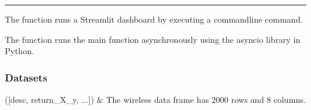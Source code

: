 \documentclass[letterpaper,10pt,english,openany,oneside]{sphinxmanual}
\begin{document}
\bigskip\hrule\bigskip


\begin{fulllineitems}
\label{\detokenize{api_reference/generated/QuadratiK.ui.UI:QuadratiK.ui.UI.main}}
\pysigstartsignatures
{}
\pysigstopsignatures
\sphinxAtStartPar
The  function runs a Streamlit dashboard by executing a command\sphinxhyphen{}line command.

\end{fulllineitems}


\begin{fulllineitems}
\label{\detokenize{api_reference/generated/QuadratiK.ui.UI:QuadratiK.ui.UI.run}}
\pysigstartsignatures
{}
\pysigstopsignatures
\sphinxAtStartPar
The function runs the main function asynchronously using the asyncio library in Python.

\end{fulllineitems}




\subsubsection{Datasets}
\label{\detokenize{api_reference/index:datasets}}\label{\detokenize{api_reference/index:module-QuadratiK.datasets}}

\begin{savenotes}\sphinxattablestart
\sphinxthistablewithglobalstyle
\sphinxthistablewithnovlinesstyle
\centering
\begin{tabulary}{\linewidth}[t]{}
\sphinxtoprule
\sphinxtableatstartofbodyhook
\sphinxAtStartPar
{\hyperref[\detokenize{api_reference/generated/QuadratiK.datasets.load_wireless_data:QuadratiK.datasets.load_wireless_data}]{}}({[}desc, return\_X\_y, ...{]})
&
\sphinxAtStartPar
The wireless data frame has 2000 rows and 8 columns.
\\
\sphinxbottomrule
\end{tabulary}
\sphinxtableafterendhook\par
\sphinxattableend\end{savenotes}
\end{document}
